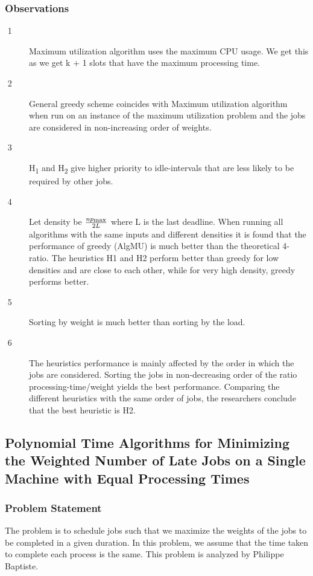 \documentclass[11pt]{article}
\begin{document}
{		\subsubsection{Observations}
		\begin{description}
			\item[$$ 1]  Maximum utilization algorithm uses the maximum CPU usage. We get this as we get k + 1 slots that have the maximum processing time. \citet{doi:10.1137/1.9781611974317.11}
			\item[$$ 2] General greedy scheme coincides with Maximum utilization algorithm when run on an instance of the maximum utilization problem and the jobs are considered in non-increasing order of weights.\citet{doi:10.1137/1.9781611974317.11}
			\item[$$ 3]H\textsubscript{1} and H\textsubscript{2} give higher priority to idle-intervals that are less likely to be required by other jobs. \citet{doi:10.1137/1.9781611974317.11}
			\item[$$ 4] Let density be \(\frac{np\textsubscript{max}}{2L}\) where L is the last deadline. When running all algorithms with the same inputs and different densities it is found that the performance of greedy (AlgMU) is much better than the theoretical 4-ratio. The heuristics H1 and H2 perform better than greedy for low densities and are close to each other, while for very high density, greedy performs better. \citet{doi:10.1137/1.9781611974317.11}
			\item[$$ 5]Sorting by weight is much better than sorting by the load. \citet{doi:10.1137/1.9781611974317.11}
			\item[$$ 6]The heuristics performance is mainly affected by the order in which the jobs are considered. Sorting the jobs in non-decreasing order of the ratio processing-time/weight yields the best performance. Comparing the different heuristics with the same order of jobs, the researchers conclude that the best heuristic is H2. \citet{doi:10.1137/1.9781611974317.11}
		\end{description}
		
		\subsection{Polynomial Time Algorithms for Minimizing the Weighted Number of Late Jobs on a Single Machine with Equal Processing Times}
		
		\subsubsection{Problem Statement}
		The problem is to schedule jobs such that we maximize the weights of the jobs to be completed in a given duration. In this problem, we assume that the time taken to complete each process is the same. This problem is analyzed by Philippe Baptiste.
		
}
\end{document}
